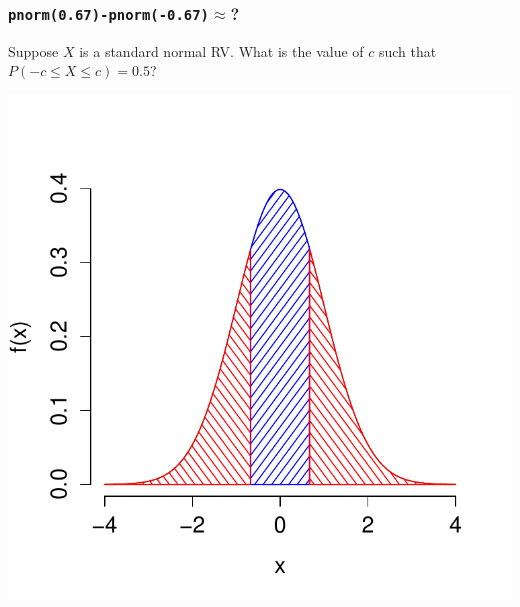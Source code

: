 \documentclass[handout]{beamer}
\begin{document}
\begin{frame}
\frametitle{\texttt{pnorm(0.67)-pnorm(-0.67)}$\approx$?}
Suppose $X$ is a standard normal RV. What is the value of $c$ such that $P(-c \leq X\leq c ) = 0.5$?
\begin{center}
\includegraphics[scale = 0.55]{./images/tail4}
\end{center}
\end{frame}

\end{document}

